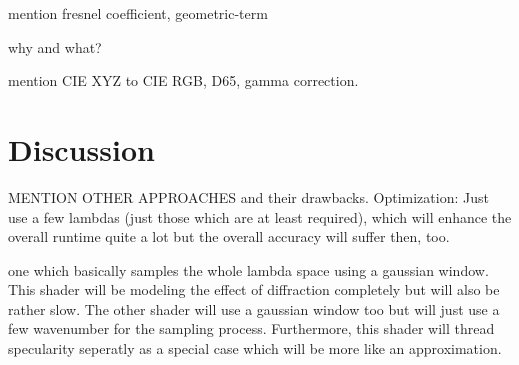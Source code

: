 mention fresnel coefficient, geometric-term

why and what?

mention CIE XYZ to CIE RGB, D65, gamma correction.

\section{Discussion}
MENTION OTHER APPROACHES and their drawbacks.
Optimization: Just use a few lambdas (just those which are at least required), which will enhance the overall runtime quite a lot but the overall accuracy will suffer then, too.

one which basically samples the whole lambda space using a gaussian window. This shader will be modeling the effect of diffraction completely but will also be rather slow. The other shader will use a gaussian window too but will just use a few wavenumber for the sampling process. Furthermore, this shader will thread specularity seperatly as a special case which will be more like an approximation. 
